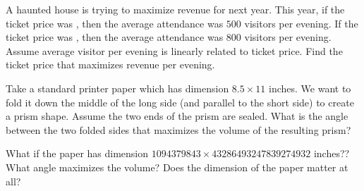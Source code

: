 \documentclass[../main.tex]{subfiles}
\begin{document}
  \begin{example}
    A haunted house is trying to maximize revenue for next year. This year, if the ticket price was , then the average attendance was \(500\) visitors per evening. If the ticket price was , then the average attendance was \(800\) visitors per evening.  Assume average visitor per evening is linearly related to ticket price. Find the ticket price that maximizes revenue per evening. 
  \end{example}

  \begin{example}
    Take a standard printer paper which has dimension \(8.5 \times 11\) inches. We want to fold it down the middle of the long side (and parallel to the short side) to create a prism shape. Assume the two ends of the prism are sealed. What is the angle between the two folded sides that maximizes the volume of the resulting prism?


    \faComment{} What if the paper has dimension \(1094379843 \times 43286493247839274932\) inches?? What angle maximizes the volume? Does the dimension of the paper matter at all?
  \end{example}
\end{document}
